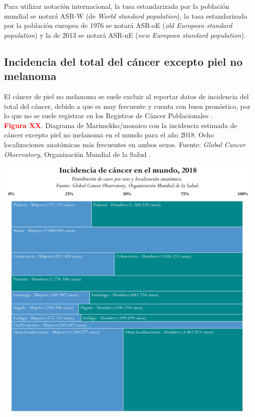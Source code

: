 Para utilizar notación internacional, la tasa estandarizada por la población mundial se notará ASR-W (de \textit{World standard population}), la tasa estandarizada por la población europea de 1976 se notará ASR-oE (\textit{old European standard population}) y la de 2013 se notará ASR-nE (\textit{new European standard population}).\\


\subsection{Incidencia del total del cáncer excepto piel no melanoma}

El cáncer de piel no melanoma se suele excluir al reportar datos de incidencia del total del cáncer, debido a que es muy frecuente y cuenta con buen pronóstico, por lo que no se suele registrar en los Registros de Cáncer Poblacionales \cite{Gordon2013, Madan2010}.\\

\textbf{\textcolor{red}{Figura XX}}. Diagrama de Marimekko/mosaico con la incidencia estimada de cáncer excepto piel no melanoma en el mundo para el año 2018. Ocho localizaciones anatómicas más frecuentes en ambos sexos. Fuente: \textit{Global Cancer Observatory}, Organización Mundial de la Salud \cite{GCO}.
\begin{center}
	\includegraphics[width=1\textwidth]{figuras/marimekko_gco.png} \\
\end{center}


